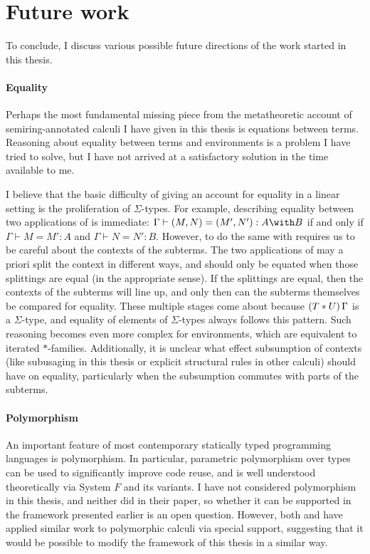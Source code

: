 \section{Future work}

To conclude, I discuss various possible future directions of the work started in
this thesis.

\paragraph{Equality}
Perhaps the most fundamental missing piece from the metatheoretic account of
semiring-annotated calculi I have given in this thesis is equations between
terms.
Reasoning about equality between terms and environments is a problem I have
tried to solve, but I have not arrived at a satisfactory solution in the time
available to me.

I believe that the basic difficulty of giving an account for equality in a
linear setting is the proliferation of $\Sigma$-types.
For example, describing equality between two applications of
 is immediate: $\Gamma \vdash (M, N) = (M', N') : A \with B$
if and only if $\Gamma \vdash M = M' : A$ and $\Gamma \vdash N = N' : B$.
However, to do the same with  requires us to be careful
about the contexts of the subterms.
The two applications of  may a priori split the context in
different ways, and should only be equated when those splittings are equal
(in the appropriate sense).
If the splittings are equal, then the contexts of the subterms will line up, and
only then can the subterms themselves be compared for equality.
These multiple stages come about because $\plr{T * U}\,\Gamma$ is a
$\Sigma$-type, and equality of elements of $\Sigma$-types always follows this
pattern.
Such reasoning becomes even more complex for environments, which are equivalent
to iterated $*$-families.
Additionally, it is unclear what effect subsumption of contexts (like subusaging
in this thesis or explicit structural rules in other calculi) should have on
equality, particularly when the subsumption commutes with parts of the subterms.

\paragraph{Polymorphism}
An important feature of most contemporary statically typed programming languages
is polymorphism.
In particular, parametric polymorphism over types can be used to significantly
improve code reuse, and is well understood theoretically via System $F$ and its
variants.
I have not considered polymorphism in this thesis, and neither did
\citet{AACMM21} in their paper, so whether it can be supported in the framework
presented earlier is an open question.
However, both \citet{Autosubst15} and \citet{Autosubst18} have applied similar
work to polymorphic calculi via special support, suggesting that it would be
possible to modify the framework of this thesis in a similar way.

